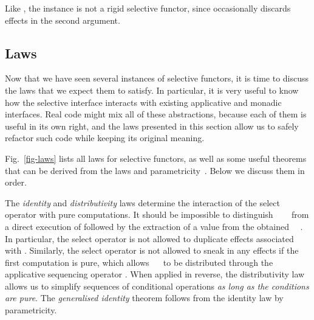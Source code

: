{\noindent
Like , the  instance is not a rigid selective functor,
since  occasionally discards effects in the second argument.

\subsection{Laws}\label{sec-laws}

Now that we have seen several instances of selective functors, it is time to
discuss the laws that we expect them to satisfy. In particular, it is very
useful to know how the selective interface interacts with existing applicative
and monadic interfaces. Real code might mix all of these abstractions, because
each of them is useful in its own right, and the laws presented in this section
allow us to safely refactor such code while keeping its original meaning.

Fig.~\ref{fig-laws} lists all laws for selective functors, as well as some
useful theorems that can be derived from the laws and
parametricity~\citep{wadler1989theorems}. Below we discuss them in order.

The \emph{identity} and \emph{distributivity} laws determine the interaction of
the select operator with pure computations. It should be impossible to
distinguish ~~~ from a direct execution of 
followed by the extraction of a value from the obtained
~~. In particular, the select operator is not allowed to
duplicate effects associated with . Similarly, the select operator is not
allowed to sneak in any effects if the first computation is pure, which allows
~~ to be distributed through the applicative sequencing
operator \hs{*>}. When applied in reverse, the distributivity law allows us to
simplify sequences of conditional operations \emph{as long as the conditions are
pure}. The \emph{generalised identity} theorem follows from the identity law by
parametricity.

}
